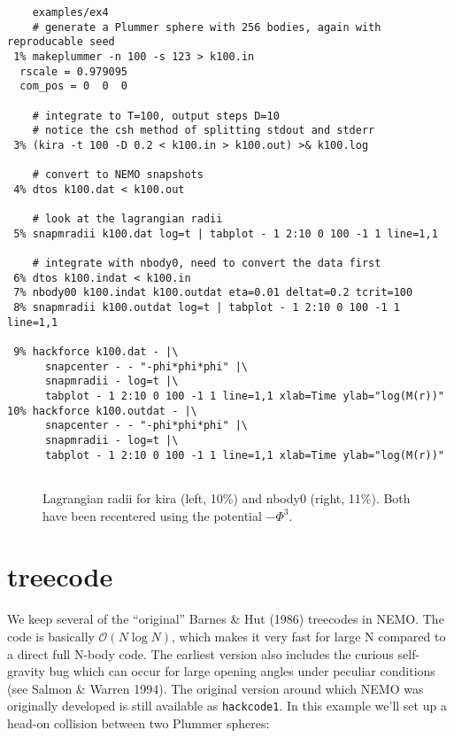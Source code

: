 \footnotesize\begin{verbatim}
    examples/ex4
    # generate a Plummer sphere with 256 bodies, again with reproducable seed
 1% makeplummer -n 100 -s 123 > k100.in
  rscale = 0.979095
  com_pos = 0  0  0

    # integrate to T=100, output steps D=10
    # notice the csh method of splitting stdout and stderr
 3% (kira -t 100 -D 0.2 < k100.in > k100.out) >& k100.log

    # convert to NEMO snapshots
 4% dtos k100.dat < k100.out

    # look at the lagrangian radii
 5% snapmradii k100.dat log=t | tabplot - 1 2:10 0 100 -1 1 line=1,1

    # integrate with nbody0, need to convert the data first
 6% dtos k100.indat < k100.in
 7% nbody00 k100.indat k100.outdat eta=0.01 deltat=0.2 tcrit=100
 8% snapmradii k100.outdat log=t | tabplot - 1 2:10 0 100 -1 1 line=1,1

 9% hackforce k100.dat - |\
      snapcenter - - "-phi*phi*phi" |\ 
      snapmradii - log=t |\
      tabplot - 1 2:10 0 100 -1 1 line=1,1 xlab=Time ylab="log(M(r))"
10% hackforce k100.outdat - |\
      snapcenter - - "-phi*phi*phi" |\
      snapmradii - log=t |\
      tabplot - 1 2:10 0 100 -1 1 line=1,1 xlab=Time ylab="log(M(r))"


\end{verbatim}\normalsize


\begin{figure}[htb]
\caption[Lagrangian radii for kira and nbody0]
{Lagrangian radii for kira (left, 10\%) and nbody0 (right, 11\%).
Both have been recentered using the potential $-\Phi^3$.
}
\label{f:kira}
\end{figure}


\section{treecode}

We keep several of the ``original'' 
Barnes \& Hut (1986) treecodes in NEMO. 
The code is basically $\mathcal{O}(N \log{N})$, which makes it very fast 
for large N compared to a direct full N-body code.
The earliest version also
includes the curious self-gravity bug which can occur for large opening angles
under peculiar conditions (see Salmon \& Warren 1994).
The original version around which NEMO was originally
developed is still available as
{\tt hackcode1}. In this example we'll set up a head-on collision between
two Plummer spheres:

